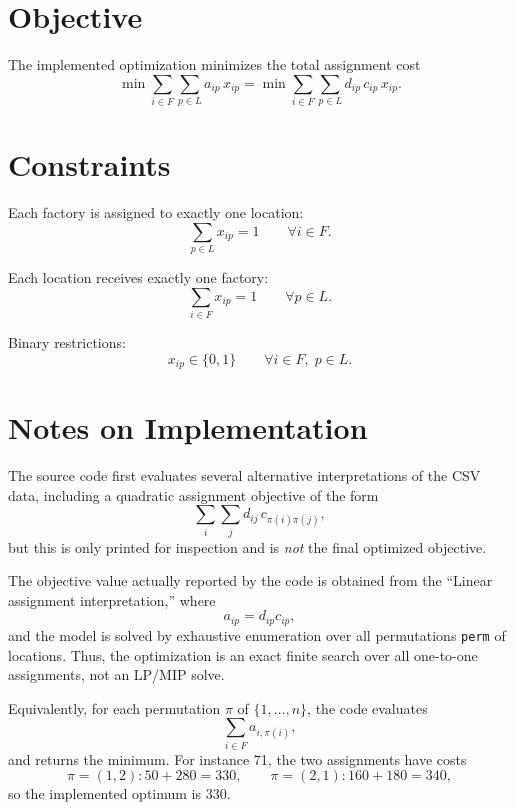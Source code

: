 \section*{Objective}

The implemented optimization minimizes the total assignment cost
\[
\min \sum_{i\in F}\sum_{p\in L} a_{ip}\,x_{ip}
=
\min \sum_{i\in F}\sum_{p\in L} d_{ip}\,c_{ip}\,x_{ip}.
\]

\section*{Constraints}

Each factory is assigned to exactly one location:
\[
\sum_{p\in L} x_{ip} = 1
\qquad \forall i\in F.
\]

Each location receives exactly one factory:
\[
\sum_{i\in F} x_{ip} = 1
\qquad \forall p\in L.
\]

Binary restrictions:
\[
x_{ip} \in \{0,1\}
\qquad \forall i\in F,\; p\in L.
\]

\section*{Notes on Implementation}

The source code first evaluates several alternative interpretations of the CSV data, including a quadratic assignment objective of the form
\[
\sum_{i}\sum_{j} d_{ij}\,c_{\pi(i)\pi(j)},
\]
but this is only printed for inspection and is \emph{not} the final optimized objective.

The objective value actually reported by the code is obtained from the ``Linear assignment interpretation,'' where
\[
a_{ip} = d_{ip}c_{ip},
\]
and the model is solved by exhaustive enumeration over all permutations \texttt{perm} of locations. Thus, the optimization is an exact finite search over all one-to-one assignments, not an LP/MIP solve.

Equivalently, for each permutation $\pi$ of $\{1,\dots,n\}$, the code evaluates
\[
\sum_{i\in F} a_{i,\pi(i)},
\]
and returns the minimum. For instance 71, the two assignments have costs
\[
\pi=(1,2): 50+280=330,
\qquad
\pi=(2,1): 160+180=340,
\]
so the implemented optimum is $330$.
